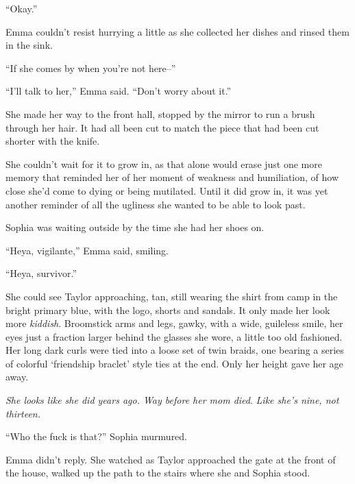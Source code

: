 ``Okay.''



Emma couldn't resist hurrying a little as she collected her dishes and rinsed them in the sink.



``If she comes by when you're not here--''



``I'll talk to her,'' Emma said.  ``Don't worry about it.''



She made her way to the front hall, stopped by the mirror to run a brush through her hair.  It had all been cut to match the piece that had been cut shorter with the knife.



She couldn't wait for it to grow in, as that alone would erase just one more memory that reminded her of her moment of weakness and humiliation, of how close she'd come to dying or being mutilated.  Until it did grow in, it was yet another reminder of all the ugliness she wanted to be able to look past.



Sophia was waiting outside by the time she had her shoes on.



``Heya, vigilante,'' Emma said, smiling.



``Heya, survivor.''



She could see Taylor approaching, tan, still wearing the shirt from camp in the bright primary blue, with the logo, shorts and sandals.  It only made her look more \emph{kiddish}.  Broomstick arms and legs, gawky, with a wide, guileless smile, her eyes just a fraction larger behind the glasses she wore, a little too old fashioned.  Her long dark curls were tied into a loose set of twin braids, one bearing a series of colorful `friendship braclet' style ties at the end.  Only her height gave her age away.



\emph{She looks like she did years ago.  Way before her mom died}.  \emph{Like she's nine, not thirteen.}



``Who the fuck is that?'' Sophia murmured.



Emma didn't reply.  She watched as Taylor approached the gate at the front of the house, walked up the path to the stairs where she and Sophia stood.



